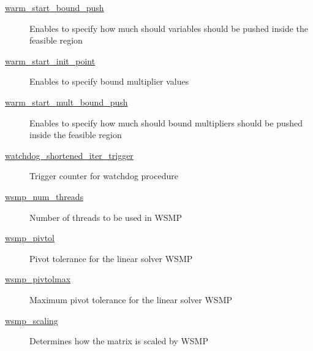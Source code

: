 \begin{description}
\item[{\hyperref[opt:warm_start_bound_push]{warm\_start\_bound\_push}}] Enables to specify how much should variables should be pushed inside the feasible region
\item[{\hyperref[opt:warm_start_init_point]{warm\_start\_init\_point}}] Enables to specify bound multiplier values
\item[{\hyperref[opt:warm_start_mult_bound_push]{warm\_start\_mult\_bound\_push}}] Enables to specify how much should bound multipliers should be pushed inside the feasible region
\item[{\hyperref[opt:watchdog_shortened_iter_trigger]{watchdog\_shortened\_iter\_trigger}}] Trigger counter for watchdog procedure
\item[{\hyperref[opt:wsmp_num_threads]{wsmp\_num\_threads}}] Number of threads to be used in WSMP
\item[{\hyperref[opt:wsmp_pivtol]{wsmp\_pivtol}}] Pivot tolerance for the linear solver WSMP
\item[{\hyperref[opt:wsmp_pivtolmax]{wsmp\_pivtolmax}}] Maximum pivot tolerance for the linear solver WSMP
\item[{\hyperref[opt:wsmp_scaling]{wsmp\_scaling}}] Determines how the matrix is scaled by WSMP
\end{description}
